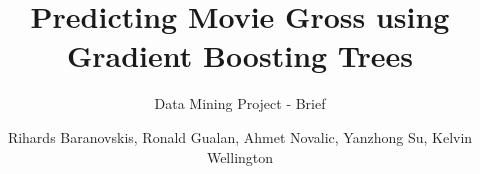 \documentclass[sigconf]{acmart}
\begin{document}
\title{Predicting Movie Gross using Gradient Boosting Trees}
\subtitle{Data Mining Project - Brief}

\author{Rihards Baranovskis, Ronald  Gualan, Ahmet Novalic, Yanzhong Su, Kelvin Wellington }


\begin{abstract}
\blindtext
\end{abstract}



\maketitle




 
\end{document}

